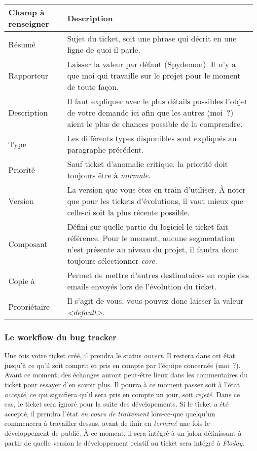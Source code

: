 \begin{longtable}{|p{3cm}|p{10cm}|}
	\hline
	Champ à renseigner & Description\\
	\hline
	Résumé & Sujet du ticket, soit une phrase qui décrit en une ligne de quoi il parle.\\
	Rapporteur & Laisser la valeur par défaut (Spydemon). Il n'y a que moi qui travaille sur le projet pour le moment de toute façon.\\
	Description & Il faut expliquer avec le plus détails possibles l'objet de votre demande ici afin que les autres (moi~?) aient le plus de chances possible de la comprendre.\\
	Type & Les différents types disponibles sont expliqués au paragraphe précédent.\\
	Priorité & Sauf ticket d'anomalie critique, la priorité doit toujours être à \emph{normale}.\\
	Version & La version que vous êtes en train d'utiliser. À noter que pour les tickets d'évolutions, il vaut mieux que celle-ci soit la plus récente possible.\\
	Composant & Défini sur quelle partie du logiciel le ticket fait référence. Pour le moment, aucune segmentation n'est présente au niveau du projet, il faudra donc toujours sélectionner \emph{core}.\\
	Copie à & Permet de mettre d'autres destinataires en copie des emails envoyés lors de l'évolution du ticket.\\
	Propriétaire & Il s'agit de vous, vous pouvez donc laisser la valeur \emph{<default>}.\\
	\hline
\end{longtable}

\subsubsection{Le workflow du bug tracker}

Une fois votre ticket créé, il prendra le status \emph{ouvert}.
Il restera dans cet état jusqu'à ce qu'il soit comprit et pris en compte par l'équipe concernée (moi~?).
Avant ce moment, des échanges auront peut-être lieux dans les commentaires du ticket pour essayer d'en savoir plus.
Il pourra à ce moment passer soit à l'état \emph{accepté}, ce qui signifiera qu'il sera pris en compte un jour, soit \emph{rejeté}.
Dans ce cas, le ticket sera ignoré pour la suite des dévelopements.
Si le ticket a été accepté, il prendra l'état \emph{en cours de traitement} lors-ce-que quelqu'un commencera à travailler dessus, avant de finir en \emph{terminé} une fois le développement de publié.
À ce moment, il sera intégré à un jalon définissant à partir de quelle version le développement relatif au ticket sera intégré à \emph{Floday}.
